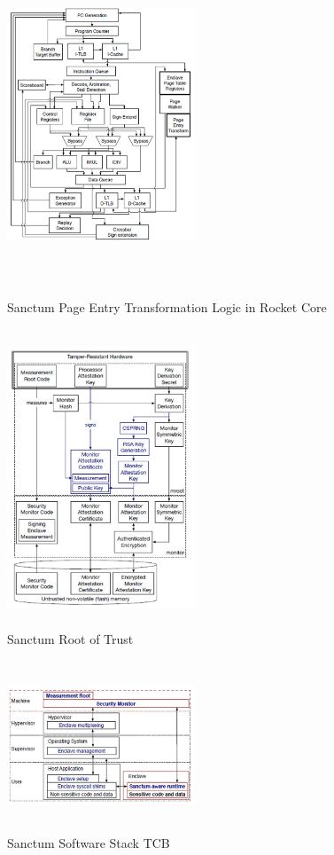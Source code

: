 \documentclass[a4paper,fleqn]{cas-dc}
\begin{document}
\begin{figure}[hbt!]
	\centering
	\includegraphics[width=0.5\textwidth,height=4in]{figs/SanctumPageEntryTransformationLogic.JPG}
	\caption{Sanctum Page Entry Transformation Logic in Rocket Core \cite{R5:6}}
\end{figure}

\begin{figure}[hbt!]
	\centering
	\includegraphics[width=0.5\textwidth,height=3.5in]{figs/SanctumRoT.JPG}
	\caption{Sanctum Root of Trust  \cite{R5:6}}
\end{figure}

\begin{figure}[hbt!]
	\centering
	\includegraphics[width=0.5\textwidth,height=2in]{figs/SanctumSwStack.JPG}
	\caption{Sanctum Software Stack TCB  \cite{R5:5}}
\end{figure}
\end{document}
